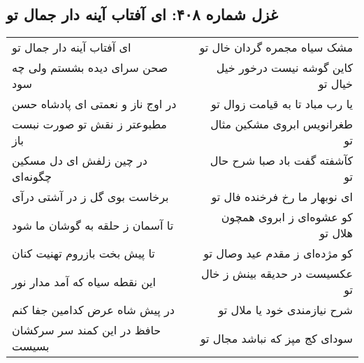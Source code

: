 \begin{center}
\section*{غزل شماره ۴۰۸: ای آفتاب آینه دار جمال تو}
\label{sec:sh408}
\begin{longtable}{l p{0.5cm} r}
ای آفتاب آینه دار جمال تو
&&
مشک سیاه مجمره گردان خال تو
\\
صحن سرای دیده بشستم ولی چه سود
&&
کاین گوشه نیست درخور خیل خیال تو
\\
در اوج ناز و نعمتی ای پادشاه حسن
&&
یا رب مباد تا به قیامت زوال تو
\\
مطبوعتر ز نقش تو صورت نبست باز
&&
طغرانویس ابروی مشکین مثال تو
\\
در چین زلفش ای دل مسکین چگونه‌ای
&&
کآشفته گفت باد صبا شرح حال تو
\\
برخاست بوی گل ز در آشتی درآی
&&
ای نوبهار ما رخ فرخنده فال تو
\\
تا آسمان ز حلقه به گوشان ما شود
&&
کو عشوه‌ای ز ابروی همچون هلال تو
\\
تا پیش بخت بازروم تهنیت کنان
&&
کو مژده‌ای ز مقدم عید وصال تو
\\
این نقطه سیاه که آمد مدار نور
&&
عکسیست در حدیقه بینش ز خال تو
\\
در پیش شاه عرض کدامین جفا کنم
&&
شرح نیازمندی خود یا ملال تو
\\
حافظ در این کمند سر سرکشان بسیست
&&
سودای کج مپز که نباشد مجال تو
\\
\end{longtable}
\end{center}
